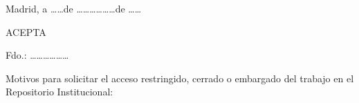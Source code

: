 \vspace*{2em}

Madrid, a \ldots \ldots  de \ldots \ldots \ldots \ldots \ldots \ldots de \ldots \ldots 

\vspace*{2em}
{\large ACEPTA}
\vspace*{2em}

Fdo.: \ldots \ldots \ldots \ldots \ldots \ldots
\vspace*{2em}

Motivos para solicitar el acceso restringido, cerrado o embargado del trabajo en el Repositorio Institucional:

\begin{tcolorbox}[height fill, sharp corners, colback=white]
\end{tcolorbox}
